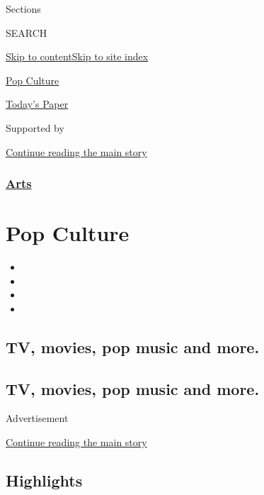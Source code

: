 Sections

SEARCH

\protect\hyperlink{site-content}{Skip to
content}\protect\hyperlink{site-index}{Skip to site index}

\href{https://www.nytimes3xbfgragh.onion/spotlight/pop-culture}{Pop
Culture}

\href{https://myaccount.nytimes3xbfgragh.onion/auth/login?response_type=cookie\&client_id=vi}{}

\href{https://www.nytimes3xbfgragh.onion/section/todayspaper}{Today's
Paper}

Supported by

\protect\hyperlink{after-sponsor}{Continue reading the main story}

\hypertarget{arts}{%
\subsubsection{\texorpdfstring{\href{/section/arts}{Arts}}{Arts}}\label{arts}}

\hypertarget{pop-culture}{%
\section{Pop Culture}\label{pop-culture}}

\begin{itemize}
\item
\item
\item
\item
\end{itemize}

\hypertarget{tv-movies-pop-music-and-more}{%
\subsection{TV, movies, pop music and
more.}\label{tv-movies-pop-music-and-more}}

\hypertarget{tv-movies-pop-music-and-more-1}{%
\subsection{TV, movies, pop music and
more.}\label{tv-movies-pop-music-and-more-1}}

Advertisement

\protect\hyperlink{after-subheader}{Continue reading the main story}

\hypertarget{highlights}{%
\subsection{Highlights}\label{highlights}}

